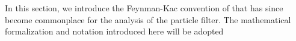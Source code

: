 

In this section, we introduce the Feynman-Kac convention of \cite{delMoral04} that has since become commonplace \cite{karjalainen23} for the analysis of the particle filter. The mathematical formalization and notation introduced here will be adopted 
